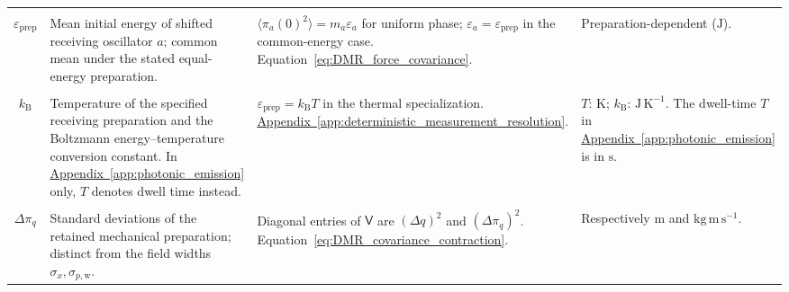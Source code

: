 \begin{longtable}{@{} c p{5.5cm} p{4cm} p{3.5cm} @{}}
\begin{tabular}[c]{@{}c@{}}$\varepsilon_a$ \\ $\varepsilon_{\mathrm{prep}}$\end{tabular} & {\raggedright Mean initial energy of shifted receiving oscillator $a$; common mean under the stated equal-energy preparation.\par} & {\raggedright $\langle\pi_a(0)^2\rangle=m_a\varepsilon_a$ for uniform phase; $\varepsilon_a=\varepsilon_{\mathrm{prep}}$ in the common-energy case. \newline Equation~\eqref{eq:DMR_force_covariance}.\par} & {\raggedright Preparation-dependent ($\mathrm J$).\par} \\

\begin{tabular}[c]{@{}c@{}}$T$ \\ $k_{\mathrm B}$\end{tabular} & {\raggedright Temperature of the specified receiving preparation and the Boltzmann energy--temperature conversion constant. In \hyperref[app:photonic_emission]{Appendix~\ref*{app:photonic_emission}} only, $T$ denotes dwell time instead.\par} & {\raggedright $\varepsilon_{\mathrm{prep}}=k_{\mathrm B}T$ in the thermal specialization. \newline \hyperref[app:deterministic_measurement_resolution]{Appendix~\ref*{app:deterministic_measurement_resolution}}.\par} & {\raggedright $T$: $\mathrm K$; $k_{\mathrm B}$: $\mathrm{J\,K^{-1}}$. The dwell-time $T$ in \hyperref[app:photonic_emission]{Appendix~\ref*{app:photonic_emission}} is in $\mathrm s$.\par} \\

\begin{tabular}[c]{@{}c@{}}$\Delta q$ \\ $\Delta\pi_q$\end{tabular} & {\raggedright Standard deviations of the retained mechanical preparation; distinct from the field widths $\sigma_x,\sigma_{p,\mathrm w}$.\par} & {\raggedright Diagonal entries of $\mathsf V$ are $(\Delta q)^2$ and $(\Delta\pi_q)^2$. \newline Equation~\eqref{eq:DMR_covariance_contraction}.\par} & {\raggedright Respectively $\mathrm m$ and $\mathrm{kg\,m\,s^{-1}}$.\par} \\


\end{longtable}

